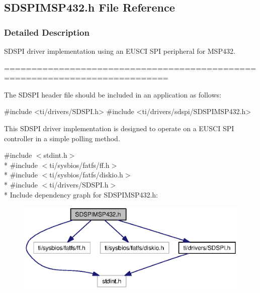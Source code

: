 \subsection{S\+D\+S\+P\+I\+M\+S\+P432.\+h File Reference}
\label{_s_d_s_p_i_m_s_p432_8h}


\subsubsection{Detailed Description}
S\+D\+S\+P\+I driver implementation using an E\+U\+S\+C\+I S\+P\+I peripheral for M\+S\+P432. 

============================================================================

The S\+D\+S\+P\+I header file should be included in an application as follows\+: 
\begin{DoxyCode}
\textcolor{preprocessor}{#include <ti/drivers/SDSPI.h>}
\textcolor{preprocessor}{#include <ti/drivers/sdspi/SDSPIMSP432.h>}
\end{DoxyCode}


This S\+D\+S\+P\+I driver implementation is designed to operate on a E\+U\+S\+C\+I S\+P\+I controller in a simple polling method. 

{\ttfamily \#include $<$stdint.\+h$>$}\\*
{\ttfamily \#include $<$ti/sysbios/fatfs/ff.\+h$>$}\\*
{\ttfamily \#include $<$ti/sysbios/fatfs/diskio.\+h$>$}\\*
{\ttfamily \#include $<$ti/drivers/\+S\+D\+S\+P\+I.\+h$>$}\\*
Include dependency graph for S\+D\+S\+P\+I\+M\+S\+P432.\+h\+:
\nopagebreak
\begin{figure}[H]
\begin{center}
\leavevmode
\includegraphics[width=350pt]{_s_d_s_p_i_m_s_p432_8h__incl}
\end{center}
\end{figure}
